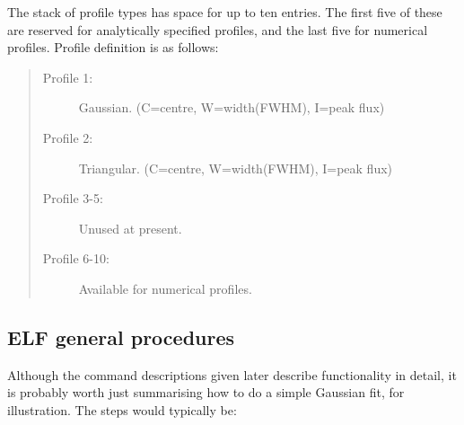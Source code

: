 \documentclass[twoside,11pt,noabs,nolof]{starlink}
\newenvironment{dipdesc}{\begin{description}}{\end{description}}
\providecommand{\dipitem}[2]{ \item[{#1}] {#2} }
\begin{document}
The stack of profile types has space for up to ten entries. The first
five of these are reserved for analytically specified profiles, and
the last five for numerical profiles. Profile definition is as
follows:

\begin{quote}
\begin{dipdesc}
\dipitem {Profile 1:} {Gaussian. (C=centre, W=width(FWHM), I=peak flux)}
\dipitem {Profile 2:} {Triangular. (C=centre, W=width(FWHM), I=peak flux)}
\dipitem {Profile 3-5:} {Unused at present.}
\dipitem {Profile 6-10:} {Available for numerical profiles.}
\end{dipdesc}
\end{quote}

\subsection {ELF general procedures}

Although the command descriptions given later describe functionality
in detail, it is probably worth just summarising how to do a simple
Gaussian fit, for illustration. The steps would typically be:
\end{document}
